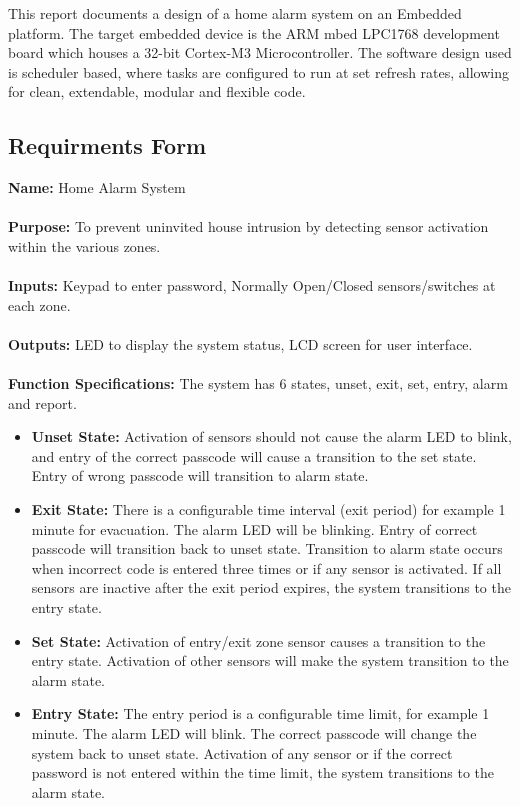 \documentclass[aps, secnumarabic, balancelastpage, asmath, amssymb, nofootinbib, floatfix,]{revtex4-2}
\begin{document}
{
\setlength{\parindent}{0pt}

This report documents a design of a home alarm system on an Embedded platform. The target embedded device is the ARM mbed LPC1768 development board which houses a 32-bit Cortex-M3 Microcontroller. The software design used is scheduler based, where tasks are configured to run at set refresh rates, allowing for clean, extendable, modular and flexible code.

\subsection{\fontsize{11.4pt}{12pt}\selectfont \bf Requirments Form \label{sec:1.1}}
\setlength{\parindent}{0pt}
{
{\bf Name: }Home Alarm System
~\\
~\\
{\bf Purpose: }To prevent uninvited house intrusion by detecting sensor activation within the various zones.
~\\
~\\
{\bf Inputs: }Keypad to enter password, Normally Open/Closed sensors/switches at each zone.
~\\
~\\
{\bf Outputs: }LED to display the system status, LCD screen for user interface.
~\\
~\\
{\bf Function Specifications: }The system has 6 states, unset, exit, set, entry, alarm and report. 
\begin{itemize}
\item \textbf{Unset State: }Activation of sensors should not cause the alarm LED to blink, and entry of the correct passcode will cause a transition to the set state. Entry of wrong passcode will transition to alarm state.
\item \textbf{Exit State: }There is a configurable time interval (exit period) for example 1 minute for evacuation. The alarm LED will be blinking. Entry of correct passcode will transition back to unset state. Transition to alarm state occurs when incorrect code is entered three times or if any sensor is activated. If all sensors are inactive after the exit period expires, the system transitions to the entry state.
\item \textbf{Set State: }Activation of entry/exit zone sensor causes a transition to the entry state. Activation of other sensors will make the system transition to the alarm state.
\item \textbf{Entry State: }The entry period is a configurable time limit, for example 1 minute. The alarm LED will blink. The correct passcode will change the system back to unset state. Activation of any sensor or if the correct password is not entered within the time limit, the system transitions to the alarm state.

\end{itemize}}}
\end{document}

